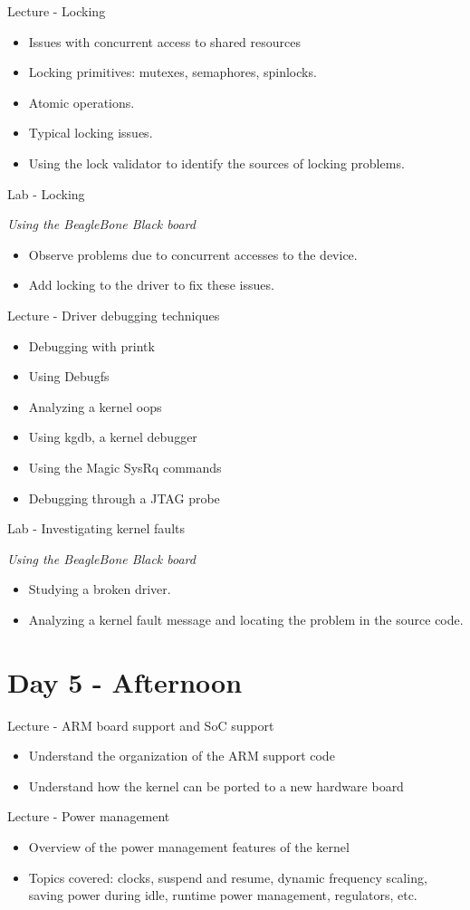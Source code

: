 \documentclass[a4paper,12pt,obeyspaces,spaces,hyphens]{article}
\begin{document}
\feagendatwocolumn
{Lecture - Locking}
{
  \begin{itemize}
  \item Issues with concurrent access to shared resources
  \item Locking primitives: mutexes, semaphores, spinlocks.
  \item Atomic operations.
  \item Typical locking issues.
  \item Using the lock validator to identify the sources of locking
    problems.
  \end{itemize}
}
{Lab - Locking}
{
  {\em Using the BeagleBone Black board}
  \begin{itemize}
  \item Observe problems due to concurrent accesses to the device.
  \item Add locking to the driver to fix these issues.
  \end{itemize}
}

\feagendatwocolumn
{Lecture - Driver debugging techniques}
{
  \begin{itemize}
  \item Debugging with printk
  \item Using Debugfs
  \item Analyzing a kernel oops
  \item Using kgdb, a kernel debugger
  \item Using the Magic SysRq commands
  \item Debugging through a JTAG probe
  \end{itemize}
}
{Lab - Investigating kernel faults}
{
  {\em Using the BeagleBone Black board}
  \begin{itemize}
  \item Studying a broken driver.
  \item Analyzing a kernel fault message and locating the problem in the
    source code.
  \end{itemize}
}

\section{Day 5 - Afternoon}

\feagendatwocolumn
{Lecture - ARM board support and SoC support}
{
  \begin{itemize}
  \item Understand the organization of the ARM support code
  \item Understand how the kernel can be ported to a new hardware
    board
  \end{itemize}
}
{Lecture - Power management}
{
  \begin{itemize}
  \item Overview of the power management features of the kernel
  \item Topics covered: clocks, suspend and resume, dynamic frequency
    scaling, saving power during idle, runtime power management,
    regulators, etc.
  \end{itemize}
}
\end{document}
